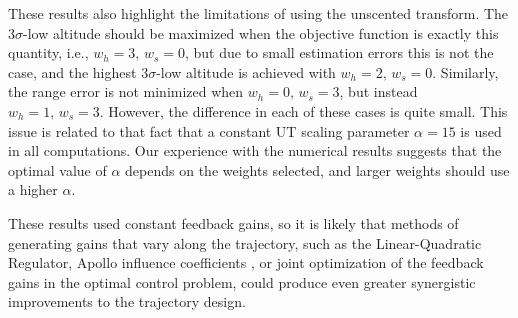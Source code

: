\documentclass[journal ]{new-aiaa}
\begin{document}
These results also highlight the limitations of using the unscented transform. The 3$\sigma$-low altitude should be maximized when the objective function is exactly this quantity, i.e., $w_h=3,\,w_s=0$, but due to small estimation errors this is not the case, and the highest 3$\sigma$-low altitude is achieved with $w_h=2,\,w_s=0$. Similarly, the range error is not minimized when $w_h=0,\,w_s=3$, but instead $w_h=1,\,w_s=3$. However, the difference in each of these cases is quite small. This issue is related to that fact that a constant UT scaling parameter $\alpha=15$ is used in all computations. Our experience with the numerical results suggests that the optimal value of $\alpha$ depends on the weights selected, and larger weights should use a higher $\alpha$. 

These results used constant feedback gains, so it is likely that methods of generating gains that vary along the trajectory, such as the Linear-Quadratic Regulator, Apollo influence coefficients \cite{Apollo}, or joint optimization of the feedback gains in the optimal control problem, could produce even greater synergistic improvements to the trajectory design. 
\end{document}

